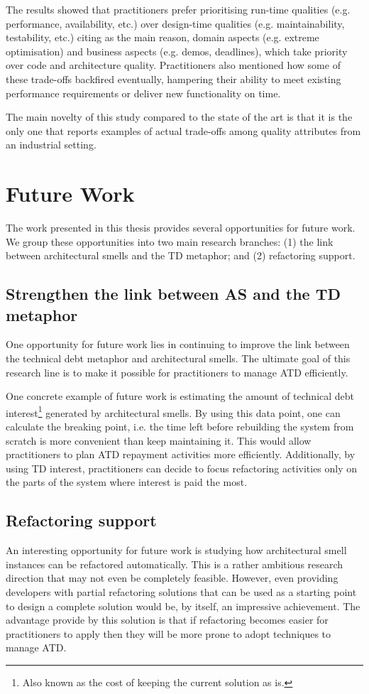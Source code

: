 The results showed that practitioners prefer prioritising run-time qualities (e.g. performance, availability, etc.) over design-time qualities (e.g. maintainability, testability, etc.) citing as the main reason, domain aspects (e.g. extreme optimisation) and business aspects (e.g. demos, deadlines), which take priority over code and architecture quality.
Practitioners also mentioned how some of these trade-offs backfired eventually, hampering their ability to meet existing performance requirements or deliver new functionality on time. 

The main novelty of this study compared to the state of the art is that it is the only one that reports examples of actual trade-offs among quality attributes from an industrial setting.

\section{Future Work}\label{c8:sec:future-work}
The work presented in this thesis provides several opportunities for future work.
We group these opportunities into two main research branches:
(1) the link between architectural smells and the TD metaphor; and (2) refactoring support.


\subsection{Strengthen the link between AS and the TD metaphor}
One opportunity for future work lies in continuing to improve the link between the technical debt metaphor and architectural smells.
The ultimate goal of this research line is to make it possible for practitioners to manage ATD efficiently.

One concrete example of future work is estimating the amount of technical debt interest\footnote{Also known as the cost of keeping the current solution as is.} generated by architectural smells.
By using this data point, one can calculate the breaking point, i.e. the time left before rebuilding the system from scratch is more convenient than keep maintaining it.
This would allow practitioners to plan ATD repayment activities more efficiently.
Additionally, by using TD interest, practitioners can decide to focus refactoring activities only on the parts of the system where interest is paid the most.


\subsection{Refactoring support}
An interesting opportunity for future work is studying how architectural smell instances can be refactored automatically.
This is a rather ambitious research direction that may not even be completely feasible.
However, even providing developers with partial refactoring solutions that can be used as a starting point to design a complete solution would be, by itself, an impressive achievement.
The advantage provide by this solution is that if refactoring becomes easier for practitioners to apply then they will be more prone to adopt techniques to manage ATD.

